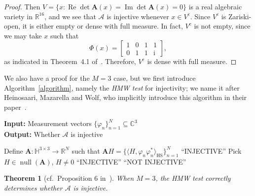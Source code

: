 \documentclass[times,10pt]{elsarticle}
\theoremstyle{plain}
\newtheorem{theorem}{Theorem}
\begin{document}
\begin{proof}
Then $V=\{x:\operatorname{Re}\det\mathbf{A}(x)=\operatorname{Im}\det\mathbf{A}(x)=0\}$ is a real algebraic variety in $\mathbb{R}^{16}$, and we see that $\mathcal{A}$ is injective whenever $x\in V^\mathrm{c}$. 
Since $V^\mathrm{c}$ is Zariski-open, it is either empty or dense with full measure. 
In fact, $V^\mathrm{c}$ is not empty, since we may take $x$ such that 
\begin{equation*}
\Phi(x)
=\left[
\begin{array}{cccc}
1&0&1&1\\
0&1&1&\mathrm{i}
\end{array}
\right],
\end{equation*}
as indicated in Theorem~4.1 of~\cite{BalanBCE:07}.
Therefore, $V^\mathrm{c}$ is dense with full measure.
\qquad
\end{proof}

We also have a proof for the $M=3$ case, but we first introduce Algorithm~\ref{algorithm}, namely the \textit{HMW test} for injectivity; we name it after Heinosaari, Mazarella and Wolf, who implicitly introduce this algorithm in their paper~\cite{HeinosaariMW:11}.

\begin{algorithm}[h]
\label{algorithm}
\caption{The HMW test for injectivity when $M=3$}
\textbf{Input:} Measurement vectors $\{\varphi_n\}_{n=1}^N\subseteq\mathbb{C}^3$\\
\textbf{Output:} Whether $\mathcal{A}$ is injective
\begin{algorithmic}
\STATE Define $\mathbf{A}\colon\mathbb{H}^{3\times 3}\rightarrow\mathbb{R}^N$ such that $\mathbf{A}H=\{\langle H,\varphi_n\varphi_n^*\rangle_\textrm{HS}\}_{n=1}^N$ \hfill {}
\STATE ``INJECTIVE'' \hfill {}
\ELSE
\STATE Pick $H\in\operatorname{null}(\mathbf{A})$, $H\neq0$
\STATE ``INJECTIVE'' \hfill {}
\ELSE
\STATE ``NOT INJECTIVE'' \hfill {}
\ENDIF
\ENDIF
\end{algorithmic}
\end{algorithm}

\begin{theorem}[cf.\ Proposition 6 in~\cite{HeinosaariMW:11}]
When $M=3$, the HMW test correctly determines whether $\mathcal{A}$ is injective.
\end{theorem}
\end{document}
